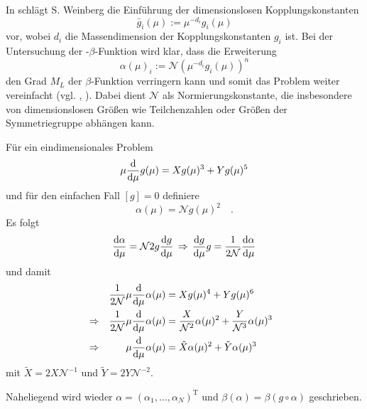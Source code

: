       In \cite{General_relativity} schlägt S. Weinberg die Einführung der dimensionslosen 
      Kopplungskonstanten
      \begin{equation}
       \bar{g}_i(\mu):= \mu^{-d_i} g_i(\mu)
      \end{equation}
      vor, wobei $d_i$ die Massendimension der Kopplungskonstanten $g_i$ ist. Bei der 
      Untersuchung der \QCDxdQCD-$\beta$-Funktion wird klar, dass die Erweiterung 
      \begin{equation}
       \alpha(\mu)_i:= \mathcal{N} \left(\mu^{-d_i} g_i(\mu)\right)^n
      \end{equation}
      den Grad $M_L$ der $\beta$-Funktion verringern kann und somit das Problem weiter 
      vereinfacht (vgl. \cite{Scale_of_dark_QCD}, \cite{Asymptotic_safety_guaranteed}). Dabei 
      dient $\mathcal{N}$ als Normierungskonstante, die insbesondere von dimensionslosen 
      Größen wie Teilchenzahlen oder Größen der Symmetriegruppe abhängen kann.
      \begin{beispiel}
	  Für ein eindimensionales Problem
	  \begin{equation}
	  \mu \frac{\text{d}}{\text{d} \mu} g(\mu) = X g(\mu)^3 + Y g(\mu)^5
	  \end{equation}
	  und für den einfachen Fall $[g]=0$ definiere 
	  \begin{equation}
	  \alpha(\mu) =\mathcal{N} g(\mu)^2 \quad .
	  \end{equation}
	  Es folgt
	\begin{equation}
	\frac{\text{d} \alpha}{\text{d} \mu}=\mathcal{N} 2 g \frac{\text{d} g}{\text{d} \mu} 
	\,\Rightarrow \, \frac{\text{d} g}{\text{d} \mu} g=\frac{1}{2\mathcal{N}} 
	\frac{\text{d} \alpha}{\text{d} \mu}
	\end{equation}
	und damit 
	\begin{align}
	 &&\frac{1}{2\mathcal{N}} \mu \frac{\text{d}}{\text{d} \mu} \alpha(\mu) &= 
	 X g(\mu)^4 +Yg(\mu)^6 &\\
	 &\Rightarrow&\frac{1}{2\mathcal{N}} \mu \frac{\text{d}}{\text{d} \mu} \alpha(\mu) &= 
	 \frac{X}{\mathcal{N}^2} \alpha(\mu)^2 + \frac{Y}{\mathcal{N}^3} \alpha(\mu)^3 &\\
	 &\Rightarrow& \mu \frac{\text{d}}{\text{d} \mu} \alpha(\mu) &=\tilde{X}\alpha(\mu)^2+\tilde{Y}
	 \alpha(\mu)^3 &
	\end{align}
	mit $\tilde{X}=2X\mathcal{N}^{-1}$ und $\tilde{Y}=2Y\mathcal{N}^{-2}$.
    \end{beispiel}
    Naheliegend wird wieder $\alpha=(\alpha_1,\ldots,\alpha_N)^\text{T}$ und 
    $\beta(\alpha)=\beta(g\circ\alpha)$ geschrieben.
    
